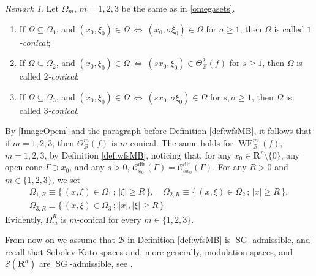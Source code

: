\documentclass[12pt,a4paper,reqno]{amsart}
\numberwithin{equation}{section}
\numberwithin{thm}{section}
\theoremstyle{definition}
\theoremstyle{remark}
\newtheorem{rem}[thm]{Remark}
\begin{document}
\par

\begin{rem}\label{rem:wfcon}
        Let $\Omega _m$, $m=1,2,3$ be the same as in \eqref{omegasets}. 
		\begin{enumerate}
				\item If $\Omega \subseteq \Omega _1$, and
		$(x_0,\xi_0)\in \Omega \ \Longleftrightarrow \ 
			(x_0,\sigma \xi_0)\in \Omega$ for $\sigma \ge 1$,
			then $\Omega$ is called \emph{$1$-conical};
		
		{\vspace{0.1cm}}
		
				\item If $\Omega \subseteq \Omega _2$, and $(x_0,\xi_0)\in
		\Omega \ \Longleftrightarrow \ 
			(sx_0,\xi_0)\in\Theta^2_{{\mathcal B}}(f)$ for $s \ge 1$,
			then $\Omega$ is called \emph{$2$-conical};
		
		{\vspace{0.1cm}}
		
				\item If $\Omega \subseteq \Omega _3$, and $(x_0,\xi_0)
		\in \Omega\ \Longleftrightarrow \ 
			(sx_0,\sigma\xi_0)\in \Omega$ for $s,\sigma \ge 1$,
		then $\Omega$ is called \emph{$3$-conical}.
			\end{enumerate}
        By \eqref{ImageOpcm} and the paragraph before Definition \ref{def:wfsMB},
	it follows that if $m=1,2,3$, then $\Theta^m_{{\mathcal B}} (f)$ is $m$-conical.
	The same holds for ${\operatorname{WF}}^m_{{\mathcal B}}(f)$, $m=1,2,3$, 
	by Definition \ref{def:wfsMB}, noticing that, for any $x_0\in
	{\mathbf R^{{r}}} \setminus \{0\}$, any open cone $\Gamma\ni x_0$,
	and any $s>0$, $\mathscr C ^{{\operatorname{dir}}} _{x_0}(\Gamma )
	=\mathscr C ^{{\operatorname{dir}}} _{s x_0}(\Gamma )$.
	For any $R>0$ and $m\in \{1,2,3\}$, we set
\begin{gather*}
\Omega_{1,R} \equiv {\{ \, {(x,\xi )\in \Omega _1}\, ;\, {|\xi |\ge R}\, \} },
\quad
\Omega_{2,R} \equiv {\{ \, {(x,\xi )\in \Omega _2}\, ;\, {|x |\ge R}\, \} },
\\[1ex]
\Omega_{3,R} \equiv {\{ \, {(x,\xi )\in \Omega _3}\, ;\, {|x|, |\xi |\ge R}\, \} }
\end{gather*}
	Evidently, $\Omega_m^R$ is $m$-conical for every $m\in \{ 1,2,3\}$.
	\end{rem}

\par

From now on we assume that ${{\mathcal B}}$ in Definition \ref{def:wfsMB} is
${\operatorname{SG}}$-admissible, and recall
that Sobolev-Kato spaces and, more generally, modulation spaces, and
$\mathscr S({\mathbf R^{d}})$ are ${\operatorname{SG}}$-admissible, see \cite{CJT2, CJT3}.
\end{document}

